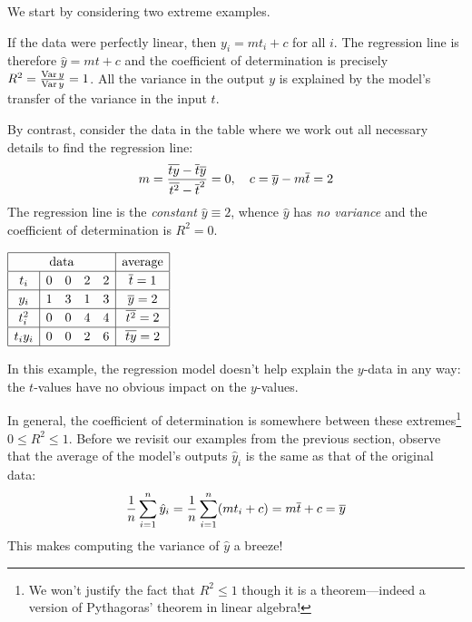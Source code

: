 \begin{examples}{}{}
	We start by considering two extreme examples.\vspace{-1pt}
	\begin{enumerate}
	  \item If the data were perfectly linear, then $y_i=mt_i+c$ for all $i$. The regression line is therefore $\hat y=mt+c$ and the coefficient of determination is precisely $R^2=\frac{\operatorname{Var} y}{\operatorname{Var} y}=1$. All the variance in the output $y$ is explained by the model's transfer of the variance in the input $t$.\par
		\begin{minipage}[t]{0.6\linewidth}\vspace{0pt}
		  \item By contrast, consider the data in the table where we work out all necessary details to find the regression line:
		  \[
		  	m=\frac{\overline{ty}-\overline{t}\overline{y}}{\overline{t^2}-\overline{t}^2}=0,\quad c=\overline{y}-m\overline{t}=2
		  \]
		  The regression line is the \emph{constant} $\hat y\equiv 2$, whence $\hat y$ has \emph{no variance} and the coefficient of determination is $R^2=0$.
		\end{minipage}
		\hfill
		\begin{minipage}[t]{0.39\linewidth}\vspace{0pt}
			\flushright
			$\renewcommand{\arraystretch}{1.2}
			\begin{array}{|c|cccc|c|}
				\hline
				\multicolumn{5}{|c|}{\text{data}}&\text{average}\\\hline
				t_i&0&0&2&2&\cl t=1\\\hline
				y_i&1&3&1&3&\cl y=2\\\hline
				t_i^2&0&0&4&4&\cl{t^2}=2\\\hline
				t_iy_i&0&0&2&6&\cl{ty}=2\\\hline%
			\end{array}$
		\end{minipage}\par
		In this example, the regression model doesn't help explain the $y$-data in any way: the $t$-values have no obvious impact on the $y$-values.
	\end{enumerate}
\end{examples}

\goodbreak

In general, the coefficient of determination is somewhere between these extremes\footnote{%
	We won't justify the fact that $R^2\le 1$ though it is a theorem---indeed a version of Pythagoras' theorem in linear algebra!%
} $0\le R^2\le 1$. Before we revisit our examples from the previous section, observe that the average of the model's outputs $\hat y_i$ is the same as that of the original data:
\[
	\frac 1n\sum_{i=1}^n\hat y_i=\frac 1n\sum_{i=1}^n(mt_i+c)=m\overline{t}+c=\overline{y}
\]
This makes computing the variance of $\hat y$ a breeze!


